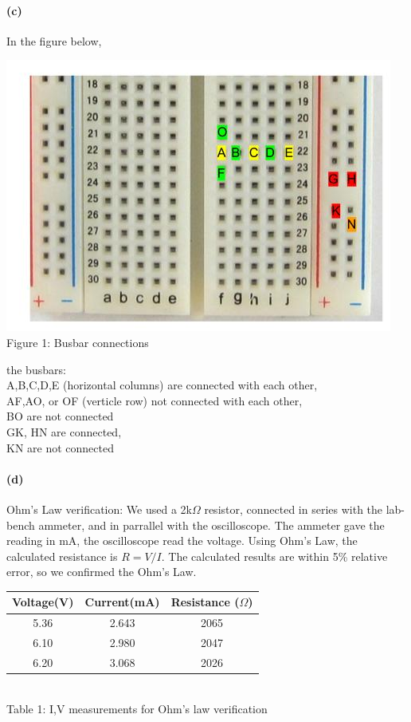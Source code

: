 \documentclass[]{article}
\begin{document}
	\paragraph{ (c)} 
	In the figure below, 
		\begin{center}
		\includegraphics[scale=0.4]{lab1_1}\\
		Figure 1: Busbar connections
		\end{center}
		the busbars: \\
			A,B,C,D,E (horizontal columns) are connected with each other,\\
			AF,AO, or OF (verticle row) not connected with each other, \\
			BO are not connected\\
			GK, HN are connected,\\
			KN are not connected
	\paragraph{ (d)}
	Ohm's Law verification: We used a 2k$\Omega$ resistor, connected in series with the lab-bench ammeter, and in parrallel with the oscilloscope. The ammeter gave the reading in mA, the oscilloscope read the voltage. Using Ohm's Law, the calculated resistance is $R=V/I$. The calculated results are within 5\% relative error, so we confirmed the Ohm's Law. 
	\begin{center}
		\begin{tabular}{|c|c|c|}
			\hline
			Voltage(V) & Current(mA) & Resistance ($\Omega$) \\
			\hline
			5.36& 2.643& 2065\\
			\hline
			6.10 & 2.980& 2047\\ 
			\hline
			6.20 & 3.068& 2026\\
			\hline
		\end{tabular}
		\\Table 1: I,V measurements for Ohm's law verification
	\end{center}
	
\end{document}
